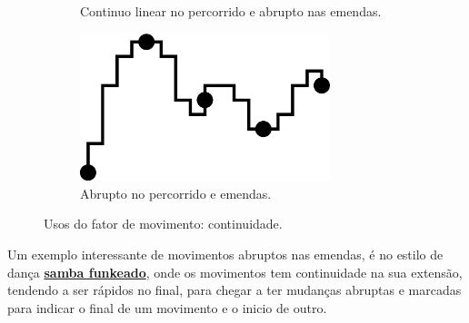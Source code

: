 \begin{figure}[!h]
\begin{subfigure}[b]{0.35\textwidth}
         \caption{Continuo linear no percorrido e abrupto nas emendas.}
         \label{fig:continudade-c}
     \end{subfigure}
     \hfill
     \begin{subfigure}[b]{0.35\textwidth}
         \centering
         \includegraphics[width=0.8\textwidth]{chapters/cap-musicalidade/continudade-d.eps}
         \caption{Abrupto no percorrido e emendas.}
         \label{fig:continudade-d}
     \end{subfigure}
\caption{Usos do fator de movimento: continuidade.}
\label{fig:continudade-all}
\end{figure}

\begin{example}
Um exemplo interessante de movimentos abruptos nas emendas, 
é no estilo de dança \hyperref[subsec:sambafunkeado]{\textbf{samba funkeado}},
onde os movimentos tem continuidade na sua extensão, tendendo a ser rápidos no final,
para chegar a ter mudanças abruptas e marcadas para indicar o final de um movimento e o inicio de outro.
\end{example}

